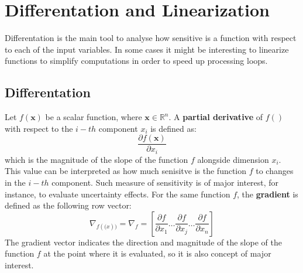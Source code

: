 
\section{Differentation and Linearization}
\label{sec:Linearization}
Differentation is the main tool to analyse how sensitive is a function with respect to each of the input variables. In some cases it might be interesting to linearize functions to simplify computations in order to speed up processing loops. 

\subsection{Differentation}
Let $f(\mathbf{x})$ be a scalar function, where $\mathbf{x} \in \mathbb{R}^n$. A \textbf{partial derivative} of $f()$ with respect to the $i-th$ component $x_i$ is defined as: 
\begin{equation}
 \frac{\partial f(\mathbf{x}) }{\partial x_i}
\end{equation}
which is the magnitude of the slope of the function $f$ alongside dimension $x_i$. This value can be interpreted as how much senisitve is the function $f$ to changes in the $i-th$ component. Such measure of sensitivity is of major interest, for instance, to evaluate uncertainty effects. For the same function $f$, the \textbf{gradient} is defined as the following row vector:
\begin{equation}
 \nabla_{f(\mathbf(x))} = \nabla_f = \left[
    \frac{\partial f }{\partial x_1} 
    \dots
    \frac{\partial f }{\partial x_j}
    \dots
    \frac{\partial f }{\partial x_n}
    \right]
\end{equation}
The gradient vector indicates the direction and magnitude of the slope of the function $f$ at the point where it is evaluated, so it is also concept of major interest.  

